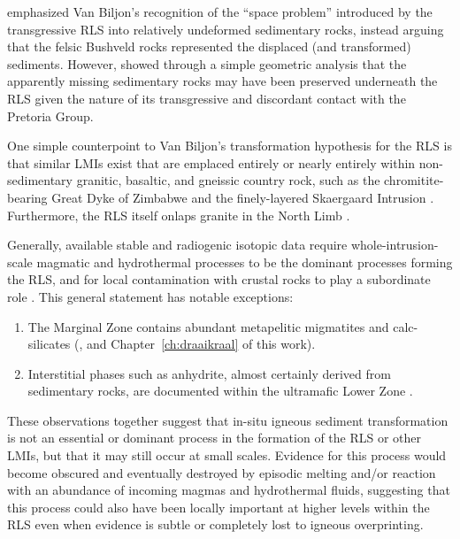\citet{button1976} emphasized Van Biljon's recognition of the ``space
problem'' introduced by the transgressive RLS into relatively undeformed
sedimentary rocks, instead arguing that the felsic Bushveld rocks
represented the displaced (and transformed) sediments. However, \citet{cawthorn1998}
showed through a simple geometric analysis that the apparently
missing sedimentary rocks may have been preserved underneath the RLS
given the nature of its transgressive and discordant contact with the
Pretoria Group.

One simple counterpoint to Van Biljon's transformation hypothesis for
the RLS is that similar LMIs exist that are emplaced entirely or nearly
entirely within non-sedimentary granitic, basaltic, and gneissic country
rock, such as the chromitite-bearing Great Dyke of Zimbabwe \citep{worst1958} and the finely-layered Skaergaard Intrusion \citep{mcbirney1996}.
Furthermore, the RLS itself onlaps granite in the North Limb \citep{vandermerwe1976}.

Generally, available stable and radiogenic isotopic data require
whole-intrusion-scale magmatic and hydrothermal processes to be the
dominant processes forming the RLS, and for local contamination with
crustal rocks to play a subordinate role \citep{zirakparvar2014,schiffries1989,schiffries1990,willmore2002,
pennistondorland2012,kruger1994,richardson2008}. This general statement has notable exceptions: 
\begin{enumerate} 
    \item The Marginal Zone contains abundant metapelitic migmatites and calc-silicates (\citealp{johnson2003,vanbiljon1949,button1976,frick1967}, 
        and Chapter~\ref{ch:draaikraal} of this work).
    \item Interstitial phases such as anhydrite, almost certainly derived from sedimentary rocks, are documented within the ultramafic
        Lower Zone \citep{wilson2017,yudovskaya2021}.
\end{enumerate}

These observations together suggest that in-situ igneous sediment
transformation is not an essential or dominant process in the formation
of the RLS or other LMIs, but that it may still occur at small scales.
Evidence for this process would become obscured and eventually destroyed
by episodic melting and/or reaction with an abundance of incoming magmas
and hydrothermal fluids, suggesting that this process could also have
been locally important at higher levels within the RLS even when
evidence is subtle or completely lost to igneous overprinting.
